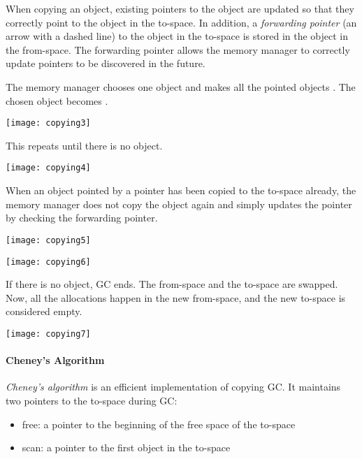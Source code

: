 When copying an object, existing pointers to the object are updated so that
they correctly point to the object in the to-space. In addition, a
\textit{forwarding pointer} (an arrow with a dashed
line) to the object in the to-space is stored in the object in the from-space.
The forwarding pointer allows the memory manager to correctly update pointers
to be discovered in the future.

The memory manager chooses one \uscn object and makes all the pointed \urch
objects \uscn. The chosen object becomes \scn.

\begin{center}
\texttt{[image: copying3]}
\end{center}

This repeats until there is no \uscn object.

\begin{center}
\texttt{[image: copying4]}
\end{center}

When an object pointed by a pointer has been copied to the to-space already, the
memory manager does not copy the object again and simply updates the pointer by
checking the forwarding pointer.

\begin{center}
\texttt{[image: copying5]}

\texttt{[image: copying6]}
\end{center}

If there is no \uscn object, GC ends. The from-space and the to-space are
swapped. Now, all the allocations happen in the new from-space, and the new
to-space is considered empty.

\begin{center}
\texttt{[image: copying7]}
\end{center}

\paragraph{Cheney's Algorithm}

\newcommand{\scan}{\textsf{scan}\xspace}
\newcommand{\free}{\textsf{free}\xspace}

\textit{Cheney's algorithm} is an efficient
implementation of copying GC. It maintains two pointers to the to-space during
GC:

\begin{itemize}
  \item \free: a pointer to the beginning of the free space of the to-space
  \item \scan: a pointer to the first \uscn object in the to-space
\end{itemize}

